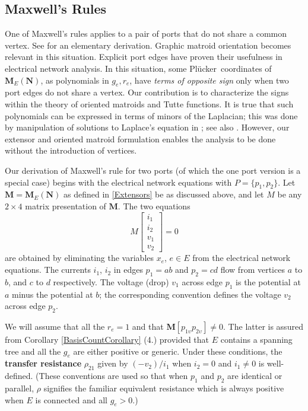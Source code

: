\documentclass[12pt]{article}
\theoremstyle{definition}
\newcommand{\Vs}{\ensuremath{\upsilon}}
\newcommand{\ext}[1]{\ensuremath{\mathbf{#1}}}
\newcommand{\Plucker}{Pl\"{u}cker\ }
\begin{document}
\subsection{Maxwell's Rules}
\label{MaxwellSection}

One of Maxwell's rules\cite{MaxR} applies to a pair of
ports that do not share a common vertex.  See \cite{ChensBook}
for an elementary derivation.  Graphic matroid orientation becomes
relevant in this situation.
Explicit port edges
have proven their usefulness in electrical network 
analysis\cite[]{LinNonLinCircuitsBook}.
In this situation,  some
\Plucker coordinates of 
$\ext{M}_E(\ext{N})$, as polynomials in $g_e,r_e$, have
\emph{terms of opposite sign} only when two port edges do not share a 
vertex.  Our contribution is to characterize the signs within the theory of 
oriented matroids and Tutte functions.
It is true that such polynomials can be expressed in terms
of minors of the Laplacian; this was done by manipulation
of solutions to Laplace's equation in \cite{BSST}; see also \cite{TutteBook}.
However, our extensor and oriented matroid formulation enables 
the analysis to be done without the introduction of vertices.

Our derivation of Maxwell's rule for two ports (of which the
one port version is a special case) begins with the electrical network
equations with $P=\{p_1,p_2\}$.  Let $\ext{M}=\ext{M}_E(\ext{N})$ as defined
in \textsection \ref{Extensors} be as discussed above, and let $M$ be
any $2\times 4$ matrix presentation of $\ext{M}$.  The
two equations
\[
M\left[\begin{array}{c}i_1 \\  i_2  \\  v_1 \\  v_2\end{array}\right]
= 0
\]
are obtained by eliminating the variables $x_e$, $e\in E$ from the
electrical network equations.  The currents $i_1$, $i_2$ in edges
$p_1=ab$ and $p_2=cd$ flow from vertices $a$ to $b$, and $c$ to $d$
respectively.  The voltage (drop) $v_1$ across edge $p_1$ is the 
potential at $a$ minus the potential at $b$; the corresponding
convention defines the voltage $v_2$ across edge $p_2$.  

We will assume that all the $r_e=1$ and 
that $\ext{M}[p_{1\Vs}p_{2\Vs}]\neq 0$.
The latter is assured from Corollary \ref{BasisCountCorollary} (4.) 
provided that $E$ contains
a spanning tree and all the $g_e$ are either positive or generic.  Under
these conditions, the \textbf{transfer resistance} $\rho_{21}$ given
by $(-v_2)/i_1$ when $i_2=0$ and $i_1\neq 0$ is well-defined.  (These 
conventions are used so that 
when $p_1$ and $p_2$ are identical or parallel,
$\rho$ signifies the familiar equivalent resistance which is always positive
when $E$ is connected and all $g_e>0$.)
\end{document}
